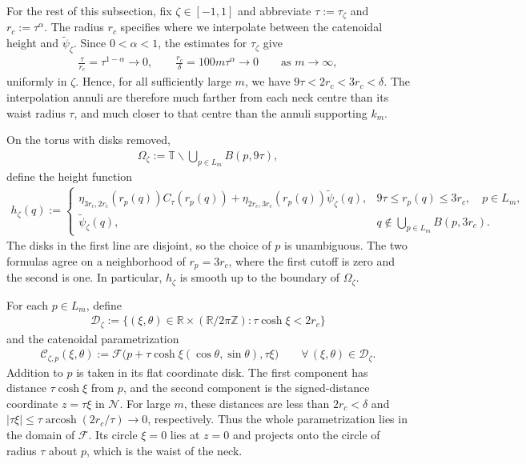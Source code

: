\documentclass[a4paper,11pt,oneside,reqno]{amsart}
\numberwithin{equation}{section}
\theoremstyle{definition}
\begin{document}
For the rest of this subsection, fix $\zeta\in[-1,1]$ and
abbreviate $\tau:=\tau_\zeta$ and $r_c:=\tau^\alpha$.
The radius $r_c$ specifies where we interpolate between the
catenoidal height and $\widetilde\psi_\zeta$. Since
$0<\alpha<1$, the estimates for $\tau_\zeta$ give
%
\begin{align*}
    \frac{\tau}{r_c}=\tau^{1-\alpha}\rightarrow0,
    \qquad
    \frac{r_c}{\delta}=100m\tau^\alpha\rightarrow0
    \qquad\text{as }m\to\infty,
\end{align*}
%
uniformly in $\zeta$. Hence, for all sufficiently large $m$,
we have $9\tau<2r_c<3r_c<\delta$. The interpolation
annuli are therefore much farther from each neck centre
than its waist radius $\tau$, and much closer to that centre
than the annuli supporting $k_m$.

On the torus with disks removed,
%
\begin{align*}
    \Omega_\zeta
    :=\mathbb T\smallsetminus
      \bigcup_{p\in L_m}B(p,9\tau),
\end{align*}
%
define the height function
%
\begin{align}
    \label{eq:s4-glued-height}
    h_\zeta(q):=
    \begin{cases}
        \eta_{3r_c,2r_c}(r_p(q))C_\tau(r_p(q))
        +\eta_{2r_c,3r_c}(r_p(q))\widetilde\psi_\zeta(q),
        &9\tau\leq r_p(q)\leq3r_c,
          \quad p\in L_m,\\
        \widetilde\psi_\zeta(q),
        &q\notin\displaystyle\bigcup_{p\in L_m}B(p,3r_c).
    \end{cases}
\end{align}
%
The disks in the first line are disjoint, so the choice of
$p$ is unambiguous. The two formulas agree on a neighborhood
of $r_p=3r_c$, where the first cutoff is zero and the
second is one. In particular, $h_\zeta$ is smooth up to
the boundary of $\Omega_\zeta$.

For each $p\in L_m$, define
%
\begin{align*}
    \mathcal D_\zeta
    :=\{(\xi,\theta)\in\mathbb R\times
         (\mathbb R/2\pi\mathbb Z):\tau\cosh\xi<2r_c\}
\end{align*}
%
and the catenoidal parametrization
%
\begin{align}
    \label{eq:s4-catenoid-parametrization}
    \mathcal C_{\zeta,p}(\xi,\theta)
    :=\mathcal F\bigl(
         p+\tau\cosh\xi(\cos\theta,\sin\theta),
         \tau\xi\bigr)
    \qquad\forall\,(\xi,\theta)\in\mathcal D_\zeta.
\end{align}
%
Addition to $p$ is taken in its flat coordinate disk.
The first component has distance $\tau\cosh\xi$ from
$p$, and the second component is the signed-distance
coordinate $z=\tau\xi$ in $\mathcal N$.
For large $m$, these distances are less than $2r_c<\delta$
and $|\tau\xi|\leq\tau\operatorname{arcosh}(2r_c/\tau)
\to0$, respectively. Thus the whole parametrization lies
in the domain of $\mathcal F$. Its circle $\xi=0$ lies
at $z=0$ and projects onto the circle of radius $\tau$
about $p$, which is the waist of the neck.
\end{document}
